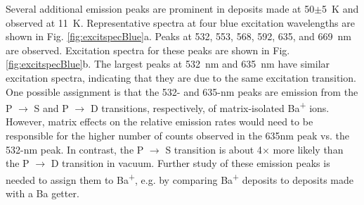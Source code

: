 Several additional emission peaks are prominent in deposits made at 50$\pm$5~K and observed at 11~K.  Representative spectra at four blue excitation wavelengths are shown in Fig. \ref{fig:excitspecBlue}a.  Peaks at 532, 553, 568, 592, 635, and 669~nm are observed.  Excitation spectra for these peaks are shown in Fig. \ref{fig:excitspecBlue}b.  The largest peaks at 532~nm and 635~nm have similar excitation spectra, indicating that they are due to the same excitation transition.  One possible assignment is that the 532- and 635-nm peaks are emission from the P $\rightarrow$ S and P $\rightarrow$ D transitions, respectively, of matrix-isolated Ba\textsuperscript{+} ions.  However, matrix effects on the relative emission rates would need to be responsible for the higher number of counts observed in the 635nm peak vs. the 532-nm peak.  In contrast, the P $\rightarrow$ S transition is about 4$\times$ more likely than the P $\rightarrow$ D transition in vacuum.  Further study of these emission peaks is needed to assign them to Ba\textsuperscript{+}, e.g. by comparing Ba\textsuperscript{+} deposits to deposits made with a Ba getter.



